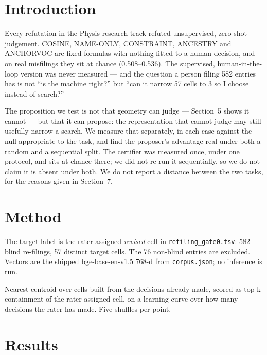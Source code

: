 \documentclass[11pt]{article}
\begin{document}
\section{Introduction}

Every refutation in the Physis research track refuted unsupervised,
zero-shot judgement. COSINE, NAME-ONLY, CONSTRAINT, ANCESTRY and ANCHORVOC
are fixed formulas with nothing fitted to a human decision, and on real
misfilings they sit at chance (0.508--0.536). The supervised,
human-in-the-loop version was never measured --- and the question a person
filing 582 entries has is not ``is the machine right?'' but ``can it narrow
57 cells to 3 so I choose instead of search?''

The proposition we test is not that geometry can judge --- Section~5 shows
it cannot --- but that it can propose: the representation that cannot judge
may still usefully narrow a search. We measure that separately, in each case
against the null appropriate to the task, and find the proposer's advantage
real under both a random and a sequential split. The certifier was measured
once, under one protocol, and sits at chance there; we did not re-run it
sequentially, so we do not claim it is absent under both. We do not report a
distance between the two tasks, for the reasons given in Section~7.

\section{Method}

The target label is the rater-assigned \emph{revised} cell in
\texttt{refiling\_gate0.tsv}: 582 blind re-filings, 57 distinct target
cells. The 76 non-blind entries are excluded. Vectors are the shipped
bge-base-en-v1.5 768-d from \texttt{corpus.json}; no inference is run.

Nearest-centroid over cells built from the decisions already made, scored
as top-k containment of the rater-assigned cell, on a learning curve over how
many decisions the rater has made. Five shuffles per point.

\section{Results}
\end{document}
